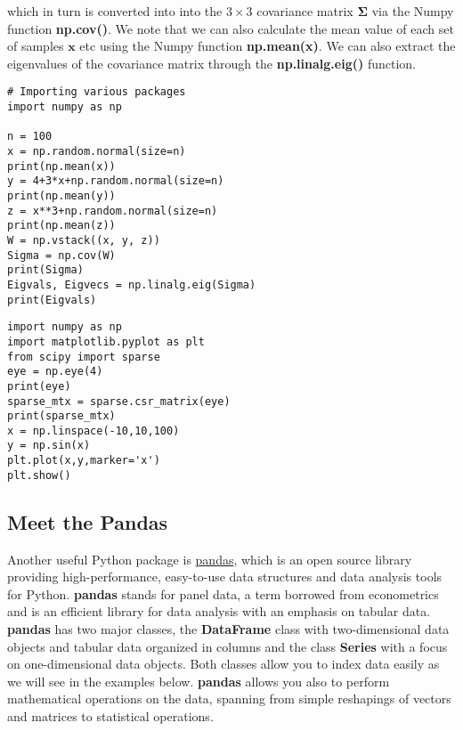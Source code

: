 \documentclass[%
oneside,                 %
final,                   %
10pt]{article}
\begin{document}
which in turn is converted into into the $3\times 3$ covariance matrix
$\bm{\Sigma}$ via the Numpy function \textbf{np.cov()}. We note that we can also calculate
the mean value of each set of samples $\bm{x}$ etc using the Numpy
function \textbf{np.mean(x)}. We can also extract the eigenvalues of the
covariance matrix through the \textbf{np.linalg.eig()} function.

















\begin{verbatim}
# Importing various packages
import numpy as np

n = 100
x = np.random.normal(size=n)
print(np.mean(x))
y = 4+3*x+np.random.normal(size=n)
print(np.mean(y))
z = x**3+np.random.normal(size=n)
print(np.mean(z))
W = np.vstack((x, y, z))
Sigma = np.cov(W)
print(Sigma)
Eigvals, Eigvecs = np.linalg.eig(Sigma)
print(Eigvals)

\end{verbatim}














\begin{verbatim}
import numpy as np
import matplotlib.pyplot as plt
from scipy import sparse
eye = np.eye(4)
print(eye)
sparse_mtx = sparse.csr_matrix(eye)
print(sparse_mtx)
x = np.linspace(-10,10,100)
y = np.sin(x)
plt.plot(x,y,marker='x')
plt.show()

\end{verbatim}


\subsection*{Meet the Pandas}

Another useful Python package is
\href{{https://pandas.pydata.org/}}{pandas}, which is an open source library
providing high-performance, easy-to-use data structures and data
analysis tools for Python. \textbf{pandas} stands for panel data, a term borrowed from econometrics and is an efficient library for data analysis with an emphasis on tabular data.
\textbf{pandas} has two major classes, the \textbf{DataFrame} class with two-dimensional data objects and tabular data organized in columns and the class \textbf{Series} with a focus on one-dimensional data objects. Both classes allow you to index data easily as we will see in the examples below. 
\textbf{pandas} allows you also to perform mathematical operations on the data, spanning from simple reshapings of vectors and matrices to statistical operations. 
\end{document}
